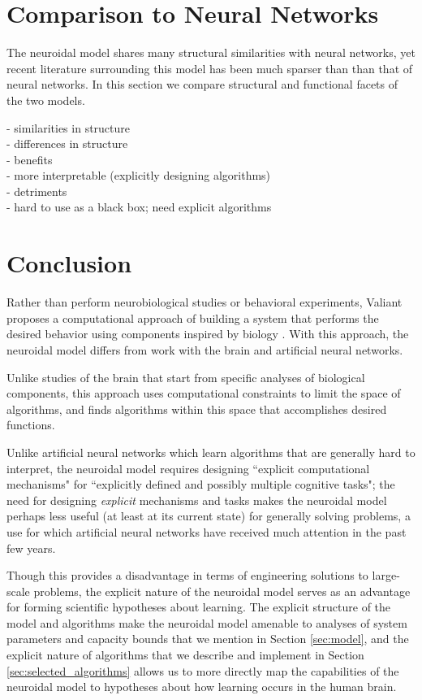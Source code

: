 \documentclass[letterpaper, 12pt]{article}
\begin{document}
\section{Comparison to Neural Networks}
The neuroidal model shares many structural similarities with neural networks, yet recent literature surrounding this model has been much sparser than than that of neural networks. In this section we compare structural and functional facets of the two models.

- similarities in structure\\
- differences in structure\\
- benefits\\
	- more interpretable (explicitly designing algorithms)\\
- detriments\\
	- hard to use as a black box; need explicit algorithms\\

\section{Conclusion}
Rather than perform neurobiological studies or behavioral experiments, Valiant proposes a computational approach of building a system that performs the desired behavior using components inspired by biology \cite{valiant_circuits_1994}. With this approach, the neuroidal model differs from work with the brain and artificial neural networks.

Unlike studies of the brain that start from specific analyses of biological components, this approach uses computational constraints to limit the space of algorithms, and finds algorithms within this space that accomplishes desired functions.

Unlike artificial neural networks which learn algorithms that are generally hard to interpret, the neuroidal model requires designing ``explicit computational mechanisms" for ``explicitly defined and possibly multiple cognitive tasks"; the need for designing \textit{explicit} mechanisms and tasks makes the neuroidal model perhaps less useful (at least at its current state) for generally solving problems, a use for which artificial neural networks have received much attention in the past few years.

Though this provides a disadvantage in terms of engineering solutions to large-scale problems, the explicit nature of the neuroidal model serves as an advantage for forming scientific hypotheses about learning. The explicit structure of the model and algorithms make the neuroidal model amenable to analyses of system parameters and capacity bounds that we mention in Section \ref{sec:model}, and the explicit nature of algorithms that we describe and implement in Section \ref{sec:selected_algorithms} allows us to more directly map the capabilities of the neuroidal model to hypotheses about how learning occurs in the human brain.



\end{document}
